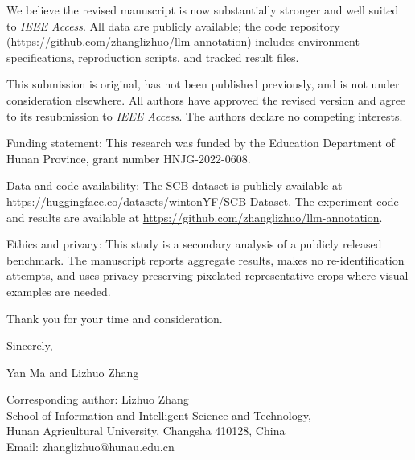 \documentclass[11pt]{article}
\begin{document}
We believe the revised manuscript is now substantially stronger and well
suited to \textit{IEEE Access}. All data are publicly available; the code
repository (\url{https://github.com/zhanglizhuo/llm-annotation}) includes
environment specifications, reproduction scripts, and tracked result files.

This submission is original, has not been published previously, and is not
under consideration elsewhere. All authors have approved the revised version
and agree to its resubmission to \textit{IEEE Access}. The authors declare no
competing interests.

Funding statement: This research was funded by the Education Department of
Hunan Province, grant number HNJG-2022-0608.

Data and code availability: The SCB dataset is publicly available at
\url{https://huggingface.co/datasets/wintonYF/SCB-Dataset}. The experiment
code and results are available at
\url{https://github.com/zhanglizhuo/llm-annotation}.

Ethics and privacy: This study is a secondary analysis of a publicly released
benchmark. The manuscript reports aggregate results, makes no re-identification
attempts, and uses privacy-preserving pixelated representative crops where
visual examples are needed.

Thank you for your time and consideration.

Sincerely,

Yan Ma and Lizhuo Zhang

Corresponding author:
Lizhuo Zhang \\
School of Information and Intelligent Science and Technology, \\
Hunan Agricultural University, Changsha 410128, China \\
Email: zhanglizhuo@hunau.edu.cn
\end{document}
